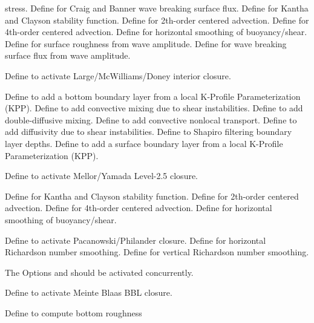 \begin{klist}
\begin{klist}
\begin{klist}
       stress.
         Define for Craig and Banner wave breaking
       surface flux.
         Define for Kantha and Clayson stability
       function.
         Define for 2th-order centered advection.
         Define for 4th-order centered advection.
         Define for horizontal smoothing of
       buoyancy/shear.
         Define for surface roughness from wave
       amplitude.
         Define for wave breaking surface flux from
       wave amplitude.
    \end{klist}
       Define to activate Large/McWilliams/Doney
   interior closure.
    \begin{klist}
       Define to add a bottom boundary layer from a local
   K-Profile Parameterization (KPP).
       Define to add convective mixing due to shear
   instabilities.
       Define to add double-diffusive mixing.
      Define to add convective nonlocal transport.
       Define to add diffusivity due to shear
   instabilities.
       Define to Shapiro filtering boundary layer
   depths.
       Define to add a surface boundary layer from a local
   K-Profile Parameterization (KPP).
    \end{klist}
       Define to activate Mellor/Yamada Level-2.5
   closure.
    \begin{klist}
         Define for Kantha and Clayson stability
       function.
         Define for 2th-order centered advection.
         Define for 4th-order centered advection.
         Define for horizontal smoothing of
       buoyancy/shear.
    \end{klist}
       Define to activate Pacanowski/Philander
   closure.
       Define for horizontal Richardson number
   smoothing.
       Define for vertical Richardson number
   smoothing.
  \end{klist}
   \mbox{}
  The Options  and  should be activated concurrently.
    \begin{klist}
       Define to activate Meinte Blaas BBL closure.
      \begin{klist}
         Define to compute bottom roughness

\end{klist}
\end{klist}
\end{klist}
